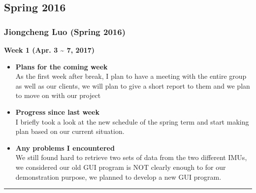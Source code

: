 \newpage
	\subsection{Spring 2016}

	\subsubsection{Jiongcheng Luo (Spring 2016)}
	\vspace{0.5cm}

	\begin{center}
		\textbf{Week 1 (Apr. 3 {\textasciitilde{}} 7, 2017)}
	\end{center}
	\begin{itemize}
		\item \textbf{Plans for the coming week}
		\\As the first week after break, I plan to have a meeting with the entire group as well as our clients, we will plan to give a short report to them and we plan to move on with our project\\

		\item \textbf{Progress since last week}
		\\I briefly took a look at the new schedule of the spring term and start making plan based on our current situation.\\

		\item \textbf{Any problems I encountered}
		\\We still found hard to retrieve two sets of data from the two different IMUs, we considered our old GUI program is NOT clearly enough to for our demonstration purpose, we planned to develop a new GUI program.\\
	\end{itemize}

	\rule{\textwidth}{0.5pt}

